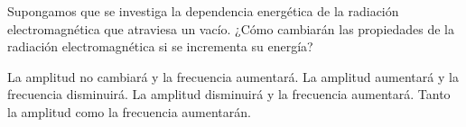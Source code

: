 Supongamos que se investiga la dependencia energética de la radiación electromagnética que atraviesa un vacío.
¿Cómo cambiarán las propiedades de la radiación electromagnética si se incrementa su energía?

\begin{choices}
    \CorrectChoice La amplitud no cambiará y la frecuencia aumentará.
    \choice La amplitud aumentará y la frecuencia disminuirá.
    \choice La amplitud disminuirá y la frecuencia aumentará.
    \choice Tanto la amplitud como la frecuencia aumentarán.
\end{choices}
